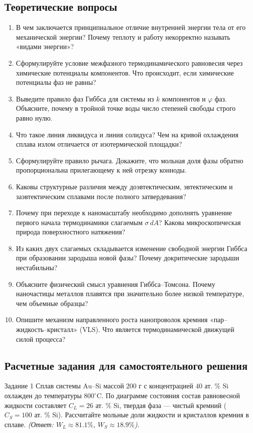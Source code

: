\documentclass[12pt,a4paper]{article}
\begin{document}
\subsection{Теоретические вопросы}
\begin{enumerate}
    \item В чем заключается принципиальное отличие внутренней энергии тела от его механической энергии? Почему теплоту и работу некорректно называть «видами энергии»?
    \item Сформулируйте условие межфазного термодинамического равновесия через химические потенциалы компонентов. Что происходит, если химические потенциалы фаз не равны?
    \item Выведите правило фаз Гиббса для системы из $k$ компонентов и $\varphi$ фаз. Объясните, почему в тройной точке воды число степеней свободы строго равно нулю.
    \item Что такое линия ликвидуса и линия солидуса? Чем на кривой охлаждения сплава излом отличается от изотермической площадки?
    \item Сформулируйте правило рычага. Докажите, что мольная доля фазы обратно пропорциональна прилегающему к ней отрезку конноды.
    \item Каковы структурные различия между доэвтектическим, эвтектическим и заэвтектическим сплавами после полного затвердевания?
    \item Почему при переходе к наномасштабу необходимо дополнять уравнение первого начала термодинамики слагаемым $\sigma\,dA$? Какова микроскопическая природа поверхностного натяжения?
    \item Из каких двух слагаемых складывается изменение свободной энергии Гиббса при образовании зародыша новой фазы? Почему докритические зародыши нестабильны?
    \item Объясните физический смысл уравнения Гиббса--Томсона. Почему наночастицы металлов плавятся при значительно более низкой температуре, чем объемные образцы?
    \item Опишите механизм направленного роста нанопроволок кремния «пар--жидкость--кристалл» (VLS). Что является термодинамической движущей силой процесса?
\end{enumerate}

\subsection{Расчетные задания для самостоятельного решения}
\begin{questbox}{Задание 1}
Сплав системы $\mathrm{Au\text{--}Si}$ массой $200\text{ г}$ с концентрацией $40\text{ ат. }\%\text{ Si}$ охлажден до температуры $800^\circ\mathrm{C}$. По диаграмме состояния состав равновесной жидкости составляет $C_L = 26\text{ ат. }\%\text{ Si}$, твердая фаза --- чистый кремний ($C_S = 100\text{ ат. }\%\text{ Si}$). Рассчитайте мольные доли жидкости и кристаллов кремния в сплаве.
\textit{(Ответ: $W_L \approx 81.1\%$, $W_S \approx 18.9\%$)}.
\end{questbox}
\end{document}

